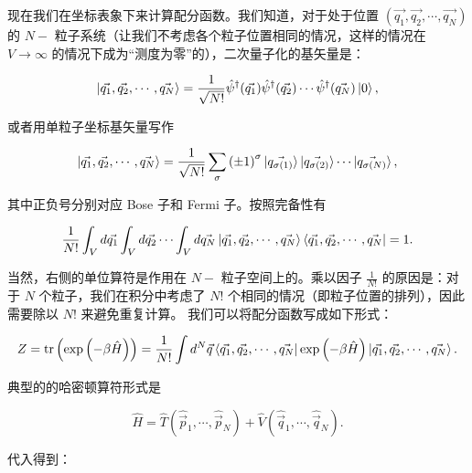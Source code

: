 现在我们在坐标表象下来计算配分函数。我们知道，对于处于位置 $\left( \vec{q_1},\vec{q_2},\cdots, \vec{q_N} \right)$ 的 $N-$ 粒子系统（让我们不考虑各个粒子位置相同的情况，这样的情况在 $V\to\infty$ 的情况下成为“测度为零”的），二次量子化的基矢量是：
\begin{linenomath}\begin{equation}
\ket{\vec{q_1},\vec{q_2},\cdots, \vec{q_N}} = \frac{1}{\sqrt{N!}} \hat{\psi}^\dagger(\vec{q_1}) \hat{\psi}^\dagger(\vec{q_2}) \cdots \hat{\psi}^\dagger(\vec{q_N}) \ket{0},
\end{equation}\end{linenomath}
或者用单粒子坐标基矢量写作
\begin{linenomath}\begin{equation}
\ket{\vec{q_1},\vec{q_2},\cdots, \vec{q_N}} = \frac{1}{\sqrt{N!}} \sum_{\sigma}\left( \pm 1 \right)^\sigma \ket{\vec{q_{\sigma(1)}}}\ket{\vec{q_{\sigma(2)}}}\cdots\ket{\vec{q_{\sigma(N)}}},
\end{equation}\end{linenomath}
其中正负号分别对应 Bose 子和 Fermi 子。按照完备性有
\begin{linenomath}\begin{equation}
    \frac{1}{N!} \int_V d\vec{q_1} \int_V d\vec{q_2} \cdots \int_V d\vec{q_N} \ket{\vec{q_1},\vec{q_2},\cdots, \vec{q_N}} \bra{\vec{q_1},\vec{q_2},\cdots, \vec{q_N}} = 1.
\end{equation}\end{linenomath}
当然，右侧的单位算符是作用在 $N-$ 粒子空间上的。乘以因子 $\frac{1}{N!}$ 的原因是：对于 $N$ 个粒子，我们在积分中考虑了 $N!$ 个相同的情况（即粒子位置的排列），因此需要除以 $N!$ 来避免重复计算。
我们可以将配分函数写成如下形式：
\begin{linenomath}\begin{equation}
    Z  = \mathrm{tr}\left( \exp\left( -\beta \hat{H} \right) \right) = \frac{1}{N!}\int d^N\vec{q} \bra{\vec{q_1},\vec{q_2},\cdots, \vec{q_N}} \exp\left( -\beta \hat{H} \right) \ket{\vec{q_1},\vec{q_2},\cdots, \vec{q_N}}.
\end{equation}\end{linenomath}
典型的的哈密顿算符形式是
\begin{linenomath}\begin{equation}
    \hat{H} = \hat{T}\left( \hat{\vec{p}}_1,\cdots,\hat{\vec{p}}_N \right) + \hat{V}\left( \hat{\vec{q}}_1,\cdots,\hat{\vec{q}}_N \right).
\end{equation}\end{linenomath}
代入得到：
